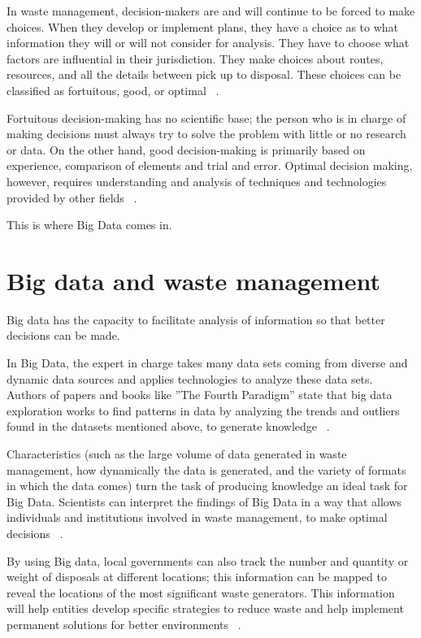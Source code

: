 \documentclass[sigconf]{acmart}
\begin{document}
In waste management, decision-makers are and will continue to be forced to make choices.  When they develop or implement plans, they have a choice as to what information they will or will not consider for analysis.  They have to choose what factors are influential in their jurisdiction.  They make choices about routes, resources, and all the details between pick up to disposal.  These choices can be classified as fortuitous, good, or optimal ~\cite{akbarpour2016}.

Fortuitous decision-making has no scientific base; the person who is in charge of making decisions must always try to solve the problem with little or no research or data.   On the other hand, good decision-making is primarily based on experience, comparison of elements and trial and error.  Optimal decision making, however, requires understanding and analysis of techniques and technologies provided by other fields ~\cite{akbarpour2016}.

This is where Big Data comes in. 

\section{ Big data and waste management}

Big data has the capacity to facilitate analysis of information so that better decisions can be made.

In Big Data, the expert in charge takes many data sets coming from diverse and dynamic data sources and applies technologies to analyze these data sets.  Authors of papers and books like ''The Fourth Paradigm'' state that big data exploration works to find patterns in data by analyzing the trends and outliers found in the datasets mentioned above, to generate knowledge ~\cite{hey2009fourth}.

Characteristics (such as the large volume of data generated in waste management, how dynamically the data is generated, and the variety of formats in which the data comes) turn the task of producing knowledge an ideal task for Big Data.  Scientists can interpret the findings of Big Data  in a way that allows individuals and institutions involved in waste management, to make optimal decisions ~\cite{yenkar2014review}. 

By using Big data, local governments can also track the number and quantity or weight of disposals at different locations; this information can be mapped to reveal the locations of the most significant waste generators.  This information will help entities develop specific strategies to reduce waste and help implement permanent solutions for better environments ~\cite{markvan2016}.
\end{document}
